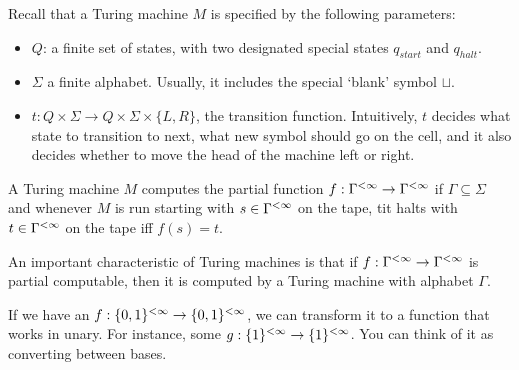 \setcounter{section}{0}

Recall that a Turing machine $M$ is specified by the following parameters:
\begin{itemize}
    \item $Q$: a finite set of states, with two designated special states $q_{start}$ and $q_{halt}$.
    \item $\Sigma$ a finite alphabet.
    Usually, it includes the special `blank' symbol $\sqcup$.
    \item $t: Q \times \Sigma \to Q \times \Sigma \times \{L, R\}$, the transition function.
    Intuitively, $t$ decides what state to transition to next, what new symbol should go on the cell, and it also decides whether to move the head of the machine left or right.
\end{itemize}

A Turing machine $M$ computes the partial function $f : \Gamma^{< \infty} \to \Gamma^{< \infty}$ if $\Gamma \subseteq \Sigma$ and whenever $M$ is run starting with $s \in \Gamma^{< \infty}$ on the tape, tit halts with $t \in \Gamma^{< \infty}$ on the tape iff $f(s) = t$.

An important characteristic of Turing machines is that if $f: \Gamma^{< \infty} \to \Gamma ^{< \infty}$ is partial computable, then it is computed by a Turing machine with alphabet $\Gamma$.

If we have an $f: \{0,1\}^{< \infty} \to \{0, 1\}^{< \infty}$, we can transform it to a function that works in unary.
For instance, some $g : \{1\}^{< \infty} \to \{1\}^{< \infty}$.
You can think of it as converting between bases.

